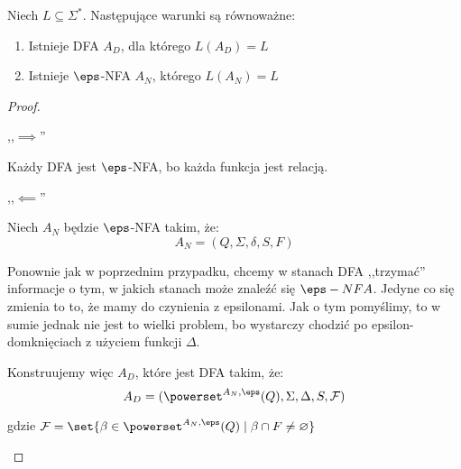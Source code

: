 \begin{theorem}
    Niech \( L \subseteq \Sigma^* \).
    Następujące warunki są równoważne:
    \begin{enumerate}
            \item Istnieje DFA \( A_D \), dla którego \( L(A_D) = L \)
        \item Istnieje \(\eps\)-NFA \( A_N \), którego \( L(A_N) = L \) 
    \end{enumerate}
\end{theorem}
\begin{proof}
     \begin{description}
        \item ,,\( \implies \)''
        
        Każdy DFA jest \(\eps\)-NFA, bo każda funkcja jest relacją.
            
        \item ,,\( \impliedby \)''
        
        Niech \(A_N\) będzie \(\eps\)-NFA takim, że: 
        \[ A_N = (Q, \Sigma, \delta, S, F) \]
        
        Ponownie jak w poprzednim przypadku, chcemy w stanach DFA ,,trzymać'' informacje o tym, w jakich stanach może znaleźć się \(\eps-NFA\). Jedyne co się zmienia to to, że mamy do czynienia z epsilonami. Jak o tym pomyślimy, to w sumie jednak nie jest to wielki problem, bo wystarczy chodzić po epsilon-domknięciach z użyciem funkcji \( \Delta \). 
        
        Konstruujemy więc \(A_D\), które jest DFA takim, że:
        \[ A_D = (\powerset^{A_N, \eps}(Q), \Sigma, \Delta, S, \mathcal{F})\]
        
        gdzie \( \mathcal{F} = \set{\beta \in \powerset^{A_N, \eps}(Q) \mid \beta \cap F \neq \varnothing} \)
    \end{description}
\end{proof}